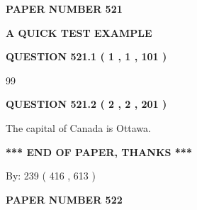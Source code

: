 \documentclass[12pt]{article}
\begin{document}
   
   
   
\newpage 
\setcounter{page}{ 
   521001 } 
   
   
   
   
 {\textbf{ \Large{ PAPER NUMBER  521  }}}
   
   
\vspace{0.2in}
   
   
   
   
   
   
 \vspace{0.2in}
{\LARGE {\textbf{ A QUICK TEST EXAMPLE}}}
   
   
  
\vspace{0.2in}
  
{\textbf{\Large{QUESTION
521.1 
 ( 1 , 1 , 101 )
}}}
  
  
 
 
\noindent{}

99
 
 
  
\vspace{0.2in}
  
{\textbf{\Large{QUESTION
521.2 
 ( 2 , 2 , 201 )
}}}
  
  
 
 
\noindent{}
 
 
The capital of Canada is Ottawa.
 
 
 
 
   
   
 \vspace{0.2in}
 
   
   
   
   
\vspace{1.0in} 
{\textbf{\large{ *** END OF PAPER, THANKS *** }}} 
   
   
\hspace{1.0in} By: 
 239 ( 416 ,  613 )
   
   
   
   
\newpage 
\setcounter{page}{ 
   522001 } 
   
   
   
   
 {\textbf{ \Large{ PAPER NUMBER  522  }}}
   
\end{document}

